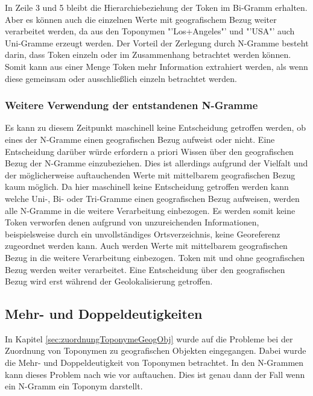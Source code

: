 				In Zeile 3 und 5 bleibt die Hierarchiebeziehung der Token im Bi-Gramm erhalten.
				Aber es können auch die einzelnen Werte mit geografischem Bezug weiter verarbeitet werden, da aus den Toponymen "'Los+Angeles"' und "'USA"' auch Uni-Gramme erzeugt werden.
				Der Vorteil der Zerlegung durch N-Gramme besteht darin, dass Token einzeln oder im Zusammenhang betrachtet werden können. 
				Somit kann aus einer Menge Token mehr Information extrahiert werden, als wenn diese gemeinsam oder ausschließlich einzeln betrachtet werden.

			\subsubsection{Weitere Verwendung der entstandenen N-Gramme} 

				Es kann zu diesem Zeitpunkt maschinell keine Entscheidung getroffen werden, ob eines der N-Gramme einen geografischen Bezug aufweist oder nicht.
				Eine Entscheidung darüber würde erfordern a priori Wissen über den geografischen Bezug der N-Gramme einzubeziehen. 
				Dies ist allerdings aufgrund der Vielfalt und der möglicherweise auftauchenden Werte mit mittelbarem geografischen Bezug kaum möglich. 
				Da hier maschinell keine Entscheidung getroffen werden kann welche Uni-, Bi- oder Tri-Gramme einen geografischen Bezug aufweisen, werden alle N-Gramme in die weitere Verarbeitung einbezogen. 			
				Es werden somit keine Token verworfen denen aufgrund von unzureichenden Informationen, beispielsweise durch ein unvollständiges Ortsverzeichnis, keine Georeferenz zugeordnet werden kann.
				Auch werden Werte mit mittelbarem geografischen Bezug in die weitere Verarbeitung einbezogen.
				Token mit und ohne geografischen Bezug werden weiter verarbeitet.
				Eine Entscheidung über den geografischen Bezug wird erst während der Geolokalisierung getroffen.

		\subsection{Mehr- und Doppeldeutigkeiten} \label{sub:VorvNutzerZeitzone} 

				In Kapitel \ref{sec:zuordnungToponymeGeogObj} wurde auf die Probleme bei der Zuordnung von Toponymen zu geografischen Objekten eingegangen.
				Dabei wurde die Mehr- und Doppeldeutigkeit von Toponymen betrachtet.
				In den N-Grammen kann dieses Problem nach wie vor auftauchen.
				Dies ist genau dann der Fall wenn ein N-Gramm ein Toponym darstellt.


